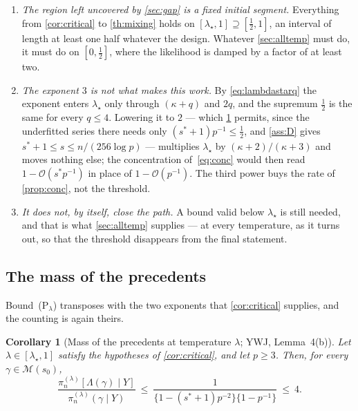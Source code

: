 \documentclass[aos]{imsart}
\newcommand{\OO}{\mathcal{O}}  %
\theoremstyle{plain}
\newtheorem{corollary}{Corollary}[section]
\theoremstyle{definition}
\begin{document}
    \begin{enumerate}[label=(\roman*),leftmargin=2.6em]
        \item \emph{The region left uncovered by \cref{sec:gap} is a fixed
        initial segment.} Everything from \cref{cor:critical} to
        \cref{th:mixing} holds on $[\lambda_\star,1]\supseteq[\tfrac12,1]$, an
        interval of length at least one half whatever the design. Whatever
        \cref{sec:alltemp} must do, it must do on $[0,\tfrac12]$, where the
        likelihood is damped by a factor of at least two.
        \item \emph{The exponent $3$ is not what makes this work.} By
        \eqref{eq:lambdastarq} the exponent enters $\lambda_\star$ only
        through $(\kappa+q)$ and $2q$, and the supremum $\tfrac12$ is the same
        for every $q\leq4$. Lowering it to $2$ --- which
        \cref{cor:prec} permits, since the underfitted series there needs
        only $(s^{\ast}+1)p^{-1}\leq\tfrac12$, and \cref{ass:D} gives
        $s^{\ast}+1\leq s\leq n/(256\log p)$ --- multiplies $\lambda_\star$ by
        $(\kappa+2)/(\kappa+3)$ and moves nothing else; the concentration
        of~\eqref{eq:conc} would then read $1-\OO(s^{\ast}p^{-1})$ in place of
        $1-\OO(p^{-1})$. The third power buys the rate of \cref{prop:conc},
        not the threshold.
        \item \emph{It does not, by itself, close the path.} A bound valid
        below $\lambda_\star$ is still needed, and that is what
        \cref{sec:alltemp} supplies --- at every temperature, as it turns
        out, so that the threshold disappears from the final statement.
    \end{enumerate}

    \subsection{The mass of the precedents}
    \label{sub:precedents}


    Bound~(P$_\lambda$) transposes with the two exponents that
    \cref{cor:critical} supplies, and the counting is again theirs.

    \begin{corollary}[Mass of the precedents at temperature $\lambda$;
    YWJ, Lemma~4(b)]
        \label{cor:prec}
        Let $\lambda\in[\lambda_\star,1]$ satisfy the hypotheses of
        \cref{cor:critical}, and let $p\geq3$. Then, for every
        $\gamma\in\mathscr{M}(s_0)$,
        \begin{equation}
            \label{eq:precmass}
            \frac{\pi_n^{(\lambda)}[\Lambda(\gamma)\mid Y]}
            {\pi_n^{(\lambda)}(\gamma\mid Y)}
            \ \leq\ \frac{1}
            {\bigl\{1-(s^{\ast}+1)p^{-2}\bigr\}
            \bigl\{1-p^{-1}\bigr\}}
            \ \leq\ 4 .
        \end{equation}
    \end{corollary}
\end{document}
